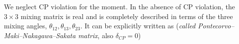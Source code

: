 We neglect CP violation for the moment. In the absence of CP violation, the \(3\times 3\) mixing matrix is real and is completely described in terms of the three mixing angles, \(\theta _{12}, \theta _{13},\theta _{23}\). It can be explicitly written as (\textit{called Pontecorvo–Maki–Nakagawa–Sakata matrix}, also \(\delta_{CP} = 0\))


